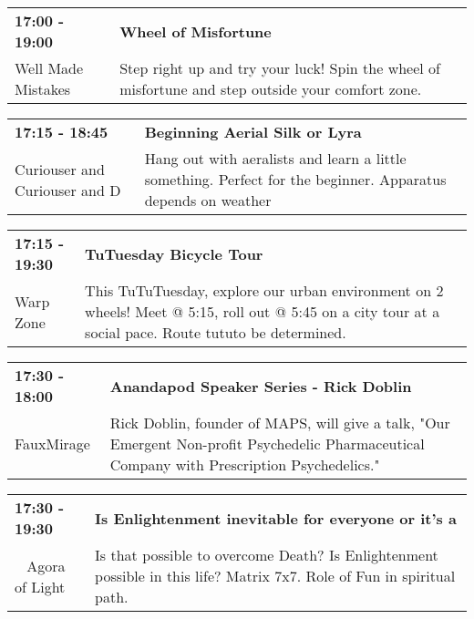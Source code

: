 \begin{tabular}{ p{1in} p{2.2in} }
    \textbf{17:00 - 19:00} & \textbf{Wheel of Misfortune} \\
    Well Made Mistakes \newline  & Step right up and try your luck! Spin the wheel of misfortune and step outside your comfort zone. \\
    \hline 
\end{tabular}
    
\begin{tabular}{ p{1in} p{2.2in} }
    \textbf{17:15 - 18:45} & \textbf{Beginning Aerial Silk or Lyra} \\
    Curiouser and Curiouser \newline 9 and D & Hang out with aeralists and learn a little something. Perfect for the beginner. Apparatus depends on weather \\
    \hline 
\end{tabular}
    
\begin{tabular}{ p{1in} p{2.2in} }
    \textbf{17:15 - 19:30} & \textbf{TuTuesday Bicycle Tour} \\
    Warp Zone \newline  & This TuTuTuesday, explore our urban environment on 2 wheels! Meet @ 5:15, roll out @ 5:45 on a city tour at a social pace. Route tututo be determined. \\
    \hline 
\end{tabular}
    
\begin{tabular}{ p{1in} p{2.2in} }
    \textbf{17:30 - 18:00} & \textbf{Anandapod Speaker Series - Rick Doblin} \\
    FauxMirage \newline  & Rick Doblin, founder of MAPS, will give a talk, "Our Emergent Non-profit Psychedelic Pharmaceutical Company with Prescription Psychedelics." \\
    \hline 
\end{tabular}
    
\begin{tabular}{ p{1in} p{2.2in} }
    \textbf{17:30 - 19:30} & \textbf{Is Enlightenment inevitable for everyone or it's a} \\
    ~ \newline Agora of Light & Is that possible to overcome Death? Is Enlightenment  possible in this life? Matrix 7x7. Role of Fun in spiritual path. \\
    \hline 
\end{tabular}
    

